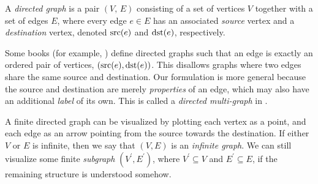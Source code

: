 \documentclass[../generics]{subfiles}
\begin{document}
\begin{definition}
A \emph{directed graph} is a pair $(V,\, E)$ consisting of a set of vertices $V$ together with a set of edges $E$, where every edge $e\in E$ has an associated \emph{source} vertex and a \emph{destination} vertex, denoted $\operatorname{src}(e)$ and $\operatorname{dst}(e)$, respectively.

Some books (for example, \cite{grimaldi}) define directed graphs such that an edge is exactly an ordered pair of vertices, $(\operatorname{src}(e),\operatorname{dst}(e))$. This disallows graphs where two edges share the same source and destination. Our formulation is more general because the source and destination are merely \emph{properties} of an edge, which may also have an additional \emph{label} of its own. This is called a \emph{directed multi-graph} in \cite{alggraph}.

A finite directed graph can be visualized by plotting each vertex as a point, and each edge as an arrow pointing from the source towards the destination. If either $V$ or $E$ is infinite, then we say that $(V, E)$ is an \emph{infinite graph}. We can still visualize some finite \emph{subgraph} $(V^\prime, E^\prime)$, where $V^\prime\subseteq V$ and $E^\prime\subseteq E$, if the remaining structure is understood somehow.
\end{definition}
\end{document}
